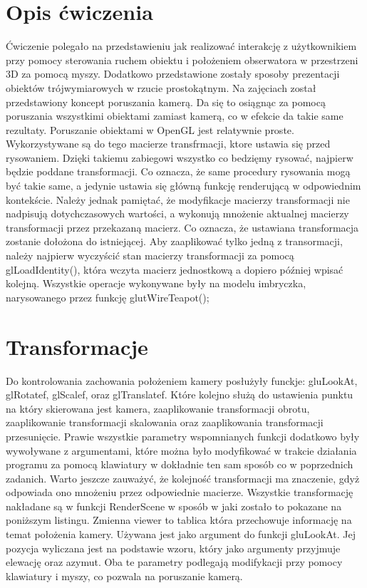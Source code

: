 \documentclass[polish,polish,a4paper]{report}
\begin{document}
\setcounter{section}{0}
\section{Opis ćwiczenia}
Ćwiczenie polegało na przedstawieniu jak realizować interakcję z użytkownikiem przy pomocy sterowania ruchem obiektu i położeniem obserwatora w przestrzeni
3D za pomocą myszy. Dodatkowo przedstawione zostały sposoby prezentacji obiektów trójwymiarowych w rzucie prostokątnym. Na zajęciach został przedstawiony
koncept poruszania kamerą. Da się to osiągnąc za pomocą poruszania wszystkimi obiektami zamiast kamerą, co w efekcie da takie same rezultaty. Poruszanie
obiektami w OpenGL jest relatywnie proste. Wykorzystywane są do tego macierze transfrmacji, ktore ustawia się przed rysowaniem. Dzięki takiemu zabiegowi
wszystko co bedzięmy rysować, najpierw będzie poddane transformacji. Co oznacza, że same procedury rysowania mogą być takie same, a jedynie ustawia się
główną funkcję renderującą w odpowiednim kontekście. Należy jednak pamiętać, że modyfikacje macierzy transformacji nie nadpisują dotychczasowych wartości,
a wykonują mnożenie aktualnej macierzy transformacji przez przekazaną macierz. Co oznacza, że ustawiana transformacja zostanie dołożona do istniejącej.
Aby zaaplikować tylko jedną z transormacji, należy najpierw wyczyścić stan macierzy transformacji za pomocą glLoadIdentity(), która wczyta macierz
jednostkową a dopiero później wpisać kolejną. Wszystkie operacje wykonywane były na modelu imbryczka, narysowanego przez funkcję glutWireTeapot();

\section{Transformacje}
Do kontrolowania zachowania położeniem kamery posłużyły funckje: gluLookAt, glRotatef, glScalef, oraz glTranslatef.
Które kolejno służą do ustawienia punktu na który skierowana jest kamera, zaaplikowanie transformacji obrotu, zaaplikowanie transformacji skalowania
oraz zaaplikowania transformacji przesunięcie. Prawie wszystkie parametry wspomnianych funkcji dodatkowo były wywoływane z argumentami, które
można było modyfikować w trakcie działania programu za pomocą klawiatury w dokładnie ten sam sposób co w poprzednich zadanich.
Warto jeszcze zauważyć, że kolejność transformacji ma znaczenie, gdyż odpowiada ono mnożeniu przez odpowiednie macierze.
Wszystkie transformację nakładane są w funkcji RenderScene w sposób w jaki zostało to pokazane na poniższym listingu.
Zmienna viewer to tablica która przechowuje informację na temat położenia kamery. Używana jest jako argument do funkcji gluLookAt.
Jej pozycja wyliczana jest na podstawie wzoru, który jako argumenty przyjmuje elewację oraz azymut.
Oba te parametry podlegają modifykacji przy pomocy klawiatury i myszy, co pozwala na poruszanie kamerą.
\end{document}

